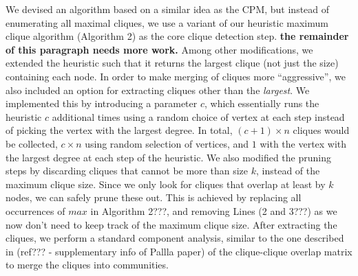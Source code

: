 We devised an algorithm based on a similar idea as the CPM, but instead of enumerating 
all maximal cliques, we use a variant of our heuristic maximum clique algorithm (Algorithm 2) 
as the core  clique detection step.  {\bf the remainder of this paragraph needs more work.}
Among other modifications, we extended the heuristic such that it returns the largest clique (not just the size) containing each node. In order to make merging of
cliques more ``aggressive'', we also included an option for extracting cliques other than the {\em largest}. We implemented this by introducing a parameter $c$, which essentially runs the heuristic $c$ additional times using a random choice of vertex at each step instead of picking the vertex with the
largest degree. In total, $(c+1) \times n$ cliques would be collected, $c \times n$ using random selection of vertices, and $1$ with the vertex with the largest degree at each step of the heuristic. We also modified the pruning steps by discarding cliques that cannot be more than size $k$, instead of the maximum clique size. Since we only look for cliques that overlap at least by $k$ nodes, we can safely prune these out. This is achieved by replacing all occurrences of $max$ in Algorithm 2???, and removing Lines (2 and 3???) as we now don't need to keep track of the maximum clique size. After extracting the cliques, we perform a standard component analysis, similar to the one described in (ref??? - supplementary info of Pallla paper) of the clique-clique overlap matrix to merge the cliques into communities.


